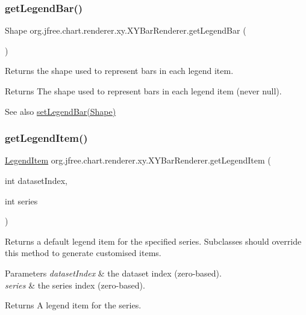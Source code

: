 \subsubsection{\texorpdfstring{get\+Legend\+Bar()}{getLegendBar()}}
{\footnotesize\ttfamily Shape org.\+jfree.\+chart.\+renderer.\+xy.\+X\+Y\+Bar\+Renderer.\+get\+Legend\+Bar (\begin{DoxyParamCaption}{ }\end{DoxyParamCaption})}

Returns the shape used to represent bars in each legend item.

\begin{DoxyReturn}{Returns}
The shape used to represent bars in each legend item (never {\ttfamily null}).
\end{DoxyReturn}
\begin{DoxySeeAlso}{See also}
\mbox{\hyperlink{classorg_1_1jfree_1_1chart_1_1renderer_1_1xy_1_1_x_y_bar_renderer_ac88695bf22df4b9ed1a250fdf23639c1}{set\+Legend\+Bar(\+Shape)}} 
\end{DoxySeeAlso}
\mbox{\label{classorg_1_1jfree_1_1chart_1_1renderer_1_1xy_1_1_x_y_bar_renderer_a3e7196fa9c8e08e7ac1b3f602dd3059b}} 
\subsubsection{\texorpdfstring{get\+Legend\+Item()}{getLegendItem()}}
{\footnotesize\ttfamily \mbox{\hyperlink{classorg_1_1jfree_1_1chart_1_1_legend_item}{Legend\+Item}} org.\+jfree.\+chart.\+renderer.\+xy.\+X\+Y\+Bar\+Renderer.\+get\+Legend\+Item (\begin{DoxyParamCaption}\item[{int}]{dataset\+Index,  }\item[{int}]{series }\end{DoxyParamCaption})}

Returns a default legend item for the specified series. Subclasses should override this method to generate customised items.


\begin{DoxyParams}{Parameters}
{\em dataset\+Index} & the dataset index (zero-\/based). \\
\hline
{\em series} & the series index (zero-\/based).\\
\hline
\end{DoxyParams}
\begin{DoxyReturn}{Returns}
A legend item for the series. 
\end{DoxyReturn}



